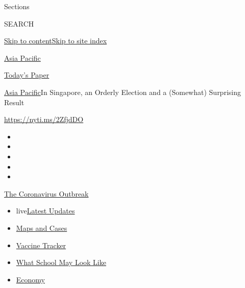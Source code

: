 Sections

SEARCH

\protect\hyperlink{site-content}{Skip to
content}\protect\hyperlink{site-index}{Skip to site index}

\href{https://www.nytimes3xbfgragh.onion/section/world/asia}{Asia
Pacific}

\href{https://myaccount.nytimes3xbfgragh.onion/auth/login?response_type=cookie\&client_id=vi}{}

\href{https://www.nytimes3xbfgragh.onion/section/todayspaper}{Today's
Paper}

\href{/section/world/asia}{Asia Pacific}\textbar{}In Singapore, an
Orderly Election and a (Somewhat) Surprising Result

\url{https://nyti.ms/2ZfjdDO}

\begin{itemize}
\item
\item
\item
\item
\item
\end{itemize}

\href{https://www.nytimes3xbfgragh.onion/news-event/coronavirus?action=click\&pgtype=Article\&state=default\&region=TOP_BANNER\&context=storylines_menu}{The
Coronavirus Outbreak}

\begin{itemize}
\tightlist
\item
  live\href{https://www.nytimes3xbfgragh.onion/2020/08/02/world/coronavirus-updates.html?action=click\&pgtype=Article\&state=default\&region=TOP_BANNER\&context=storylines_menu}{Latest
  Updates}
\item
  \href{https://www.nytimes3xbfgragh.onion/interactive/2020/us/coronavirus-us-cases.html?action=click\&pgtype=Article\&state=default\&region=TOP_BANNER\&context=storylines_menu}{Maps
  and Cases}
\item
  \href{https://www.nytimes3xbfgragh.onion/interactive/2020/science/coronavirus-vaccine-tracker.html?action=click\&pgtype=Article\&state=default\&region=TOP_BANNER\&context=storylines_menu}{Vaccine
  Tracker}
\item
  \href{https://www.nytimes3xbfgragh.onion/interactive/2020/07/29/us/schools-reopening-coronavirus.html?action=click\&pgtype=Article\&state=default\&region=TOP_BANNER\&context=storylines_menu}{What
  School May Look Like}
\item
  \href{https://www.nytimes3xbfgragh.onion/live/2020/07/31/business/stock-market-today-coronavirus?action=click\&pgtype=Article\&state=default\&region=TOP_BANNER\&context=storylines_menu}{Economy}
\end{itemize}

